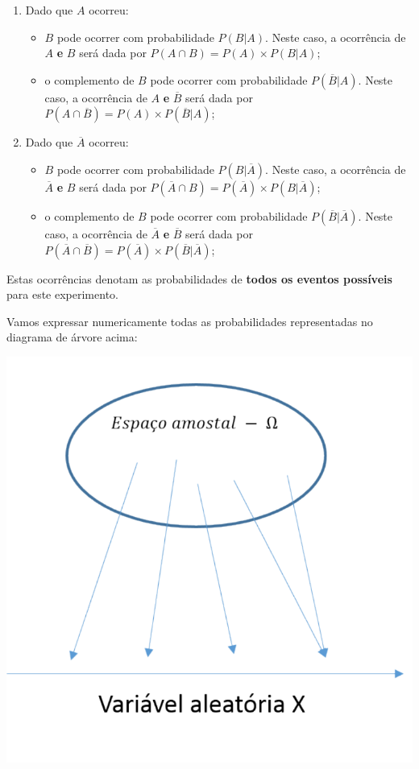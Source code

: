 \documentclass[
]{book}
\providecommand{\tightlist}{%
  \setlength{\itemsep}{0pt}\setlength{\parskip}{0pt}}
\begin{document}
\begin{enumerate}
\def\labelenumi{\arabic{enumi}.}
\tightlist
\item
  Dado que \(A\) ocorreu:

  \begin{itemize}
  \tightlist
  \item
    \(B\) pode ocorrer com probabilidade \(P(B|A)\). Neste caso, a ocorrência de \(A\) \textbf{e} \(B\) será dada por \(P(A \cap B) = P(A) \times P(B|A)\);
  \item
    o complemento de \(B\) pode ocorrer com probabilidade \(P(\overline{B}|A)\). Neste caso, a ocorrência de \(A\) \textbf{e} \(\overline{B}\) será dada por \(P(A \cap \overline{B}) = P(A) \times P(\overline{B}|A)\);
  \end{itemize}
\item
  Dado que \(\overline{A}\) ocorreu:

  \begin{itemize}
  \tightlist
  \item
    \(B\) pode ocorrer com probabilidade \(P(B|\overline{A})\). Neste caso, a ocorrência de \(\overline{A}\) \textbf{e} \(B\) será dada por \(P(\overline{A} \cap B) = P(\overline{A}) \times P(B|\overline{A})\);
  \item
    o complemento de \(B\) pode ocorrer com probabilidade \(P(\overline{B}|\overline{A})\). Neste caso, a ocorrência de \(\overline{A}\) \textbf{e} \(\overline{B}\) será dada por \(P(\overline{A} \cap \overline{B}) = P(\overline{A}) \times P(\overline{B}|\overline{A})\);
  \end{itemize}
\end{enumerate}

Estas ocorrências denotam as probabilidades de \textbf{todos os eventos possíveis} para este experimento.

Vamos expressar numericamente todas as probabilidades representadas no diagrama de árvore acima:

\includegraphics{probest-cambientais_files/figure-latex/unnamed-chunk-193-1.pdf}
\end{document}
